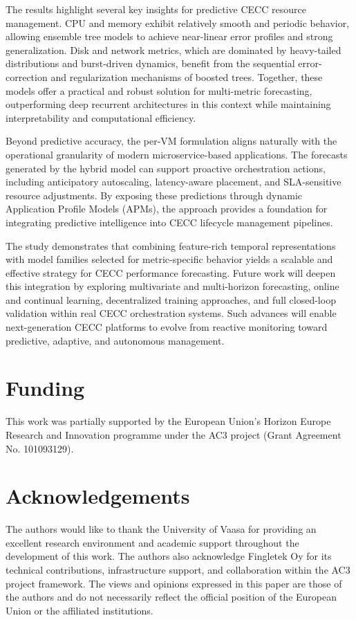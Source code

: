 \documentclass[a4paper,fleqn]{cas-dc}
\begin{document}
The results highlight several key insights for predictive CECC resource management. CPU and memory exhibit relatively smooth and periodic behavior, allowing ensemble tree models to achieve near-linear error profiles and strong generalization. Disk and network metrics, which are dominated by heavy-tailed distributions and burst-driven dynamics, benefit from the sequential error-correction and regularization mechanisms of boosted trees. Together, these models offer a practical and robust solution for multi-metric forecasting, outperforming deep recurrent architectures in this context while maintaining interpretability and computational efficiency.

Beyond predictive accuracy, the per-VM formulation aligns naturally with the operational granularity of modern microservice-based applications. The forecasts generated by the hybrid model can support proactive orchestration actions, including anticipatory autoscaling, latency-aware placement, and SLA-sensitive resource adjustments. By exposing these predictions through dynamic Application Profile Models (APMs), the approach provides a foundation for integrating predictive intelligence into CECC lifecycle management pipelines.

The study demonstrates that combining feature-rich temporal representations with model families selected for metric-specific behavior yields a scalable and effective strategy for CECC performance forecasting. Future work will deepen this integration by exploring multivariate and multi-horizon forecasting, online and continual learning, decentralized training approaches, and full closed-loop validation within real CECC orchestration systems. Such advances will enable next-generation CECC platforms to evolve from reactive monitoring toward predictive, adaptive, and autonomous management.

\section*{Funding}

This work was partially supported by the European Union’s Horizon Europe Research and Innovation programme under the AC3 project (Grant Agreement No. 101093129).

\section*{Acknowledgements}

The authors would like to thank the University of Vaasa for providing an excellent research environment and academic support throughout the development of this work. The authors also acknowledge Fingletek Oy for its technical contributions, infrastructure support, and collaboration within the AC3 project framework. The views and opinions expressed in this paper are those of the authors and do not necessarily reflect the official position of the European Union or the affiliated institutions.
\end{document}
